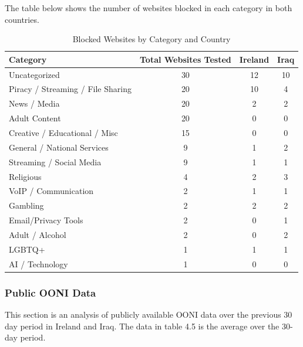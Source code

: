 The table below shows the number of websites blocked in each category in both countries.

\vspace{2em}

\begin{table}[H]
\centering
\caption{Blocked Websites by Category and Country}
\begin{tabular}{lccc}
\toprule
\textbf{Category} & \textbf{Total Websites Tested} & \textbf{Ireland} & \textbf{Iraq} \\
\midrule
Uncategorized                      & 30 & 12 & 10 \\
Piracy / Streaming / File Sharing  & 20 & 10 & 4 \\
News / Media                       & 20 & 2 & 2 \\
Adult Content                      & 20 & 0 & 0 \\
Creative / Educational / Misc      & 15 & 0 & 0 \\
General / National Services        & 9 & 1 & 2 \\
Streaming / Social Media           & 9 & 1 & 1 \\
Religious                          & 4 & 2 & 3 \\
VoIP / Communication               & 2 & 1 & 1 \\
Gambling                           & 2 & 2 & 2 \\
Email/Privacy Tools                & 2 & 0 & 1 \\
Adult / Alcohol                    & 2 & 0 & 2 \\
LGBTQ+                             & 1 & 1 & 1 \\
AI / Technology                    & 1 & 0 & 0 \\
\bottomrule
\end{tabular}
\label{tab:category_block}
\end{table}

\subsubsection{Public OONI Data}

This section is an analysis of publicly available OONI data over the previous 30 day period in Ireland and Iraq. The data in table 4.5 is the average over the 30-day period.

\vspace{2em}

